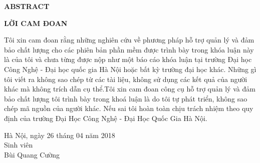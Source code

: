 \documentclass[12pt]{report}
\begin{document}
\newpage
\begin{titlepage}
\begin{center}
	\textbf{\large ABSTRACT}
\end{center}
\end{titlepage}

\newpage
\begin{titlepage}
\begin{center}
	\textbf{\large LỜI CAM ĐOAN}
\end{center}
Tôi xin cam đoan rằng những nghiên cứu về phương pháp hỗ trợ quản lý và đảm bảo chất lượng cho các phiên bản phần mềm được trình bày trong khóa luận này là của tôi và chưa từng được nộp như một báo cáo khóa luận tại trường Đại học Công Nghệ - Đại học quốc gia Hà Nội hoặc bất kỳ trường đại học khác. Những gì tôi viết ra không sao chép từ các tài liệu, không sử dụng các kết quả của người khác mà không trích dẫn cụ thể.Tôi xin cam đoan công cụ hỗ trợ quản lý và đảm bảo chất lượng tôi trình bày trong khoá luận là do tôi tự phát triển, không sao chép mã nguồn của người khác. Nếu sai tôi hoàn toàn chịu trách nhiệm theo quy định của trường Đại Học Công Nghệ - Đại Học Quốc Gia Hà Nội.\\

\begin{flushright}
	\begin{varwidth}{\linewidth}\centering
		Hà Nội, ngày 26 tháng 04 năm 2018\\
		Sinh viên\\[2cm]
		Bùi Quang Cường
	\end{varwidth}
\end{flushright}
\end{titlepage}

\newpage
\begin{titlepage}
\tableofcontents
\end{titlepage}

\newpage
\begin{titlepage}
\listoftables
\end{titlepage}

\newpage
\begin{titlepage}
	\listoffigures
\end{titlepage}

\newpage
\setcounter{page}{1}
\end{document}
